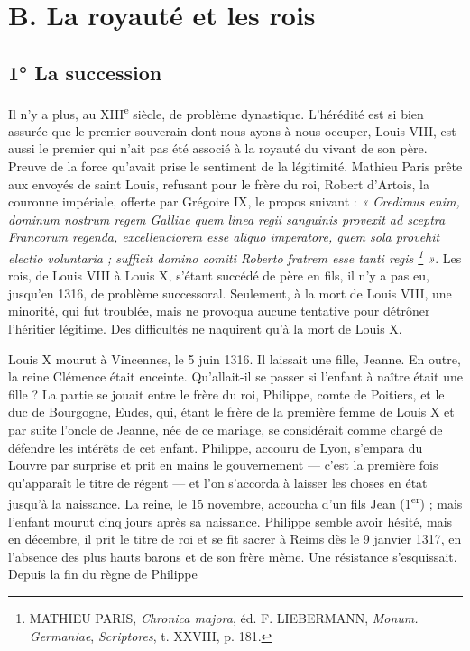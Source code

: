 \documentclass[french,twoside]{book} %
\begin{document}
\section[B. La royauté et les rois]{B. La royauté et les rois}
\label{c03b}
\subsection[1° La succession]{1° La succession}
\label{c03b1}
\noindent Il n’y a plus, au XIII\textsuperscript{e} siècle, de problème dynastique. L’hérédité est si bien assurée que le premier souverain dont nous ayons à nous occuper, Louis VIII, est aussi le premier qui n’ait pas été associé à la royauté du vivant de son père. Preuve de la force qu’avait prise le sentiment de la légitimité. Mathieu Paris prête aux envoyés de saint Louis, refusant pour le frère du roi, Robert d’Artois, la couronne impériale, offerte par Grégoire IX, le propos suivant : \emph{« Credimus enim, dominum nostrum regem Galliae quem linea regii sanguinis provexit ad sceptra Francorum regenda, excellenciorem esse aliquo imperatore, quem sola provehit electio voluntaria ; sufficit domino comiti Roberto fratrem esse tanti regis \footnote{ MATHIEU PARIS, {\itshape Chronica majora}, éd. F. LIEBERMANN, {\itshape Monum. Germaniae}, {\itshape Scriptores}, t. XXVIII, p. 181.} »}. Les rois, de Louis VIII à Louis X, s’étant succédé de père en fils, il n’y a pas eu, jusqu’en 1316, de problème successoral. Seulement, à la mort de Louis VIII, une minorité, qui fut troublée, mais ne provoqua aucune tentative pour détrôner l’héritier légitime. Des difficultés ne naquirent qu’à la mort de Louis X.\par
Louis X mourut à Vincennes, le 5 juin 1316. Il laissait une fille, Jeanne. En outre, la reine Clémence était enceinte. Qu’allait-il se passer si l’enfant à naître était une fille ? La partie se jouait entre le frère du roi, Philippe, comte de Poitiers, et le duc de Bourgogne, Eudes, qui, étant le frère de la première femme de Louis X et par suite l’oncle de Jeanne, née de ce mariage, se considérait comme chargé de défendre les intérêts de cet enfant. Philippe, accouru de Lyon, s’empara du Louvre par surprise et prit en mains le gouvernement — c’est la première fois qu’apparaît le titre de régent — et l’on s’accorda à laisser les choses en état jusqu’à la naissance. La reine, le 15 novembre, accoucha d’un fils Jean (1\textsuperscript{er}) ; mais l’enfant mourut cinq jours après sa naissance. Philippe semble avoir hésité, mais en décembre, il prit le titre de roi et se fit sacrer à Reims dès le 9 janvier 1317, en l’absence des plus hauts barons et de son frère même. Une résistance s’esquissait. Depuis la fin du règne de Philippe  
\end{document}
